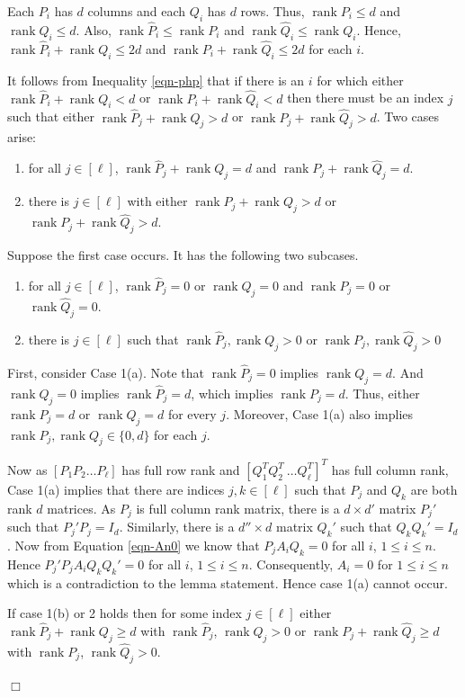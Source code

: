 \documentclass[10pt,a4paper]{article}
\newenvironment{proofof}[1]{\noindent{\it Proof of #1. }} {{\qed}}
\def\qed{\hspace*{\fill} $\Box$\par\medskip}
\newcommand{\op}[1]{\ensuremath{\operatorname{#1}}}
\newcommand{\rank}{\op{rank}}
\begin{document}
\begin{proofof}{Claim~\ref{php-simplify}}

Each $P_i$ has $d$ columns and each $Q_i$ has $d$ rows. Thus, $\rank
P_i\le d$ and $\rank Q_i\le d$. Also, $\rank \hat{P}_i \leq \rank P_i$
and $\rank \hat{Q}_i \leq \rank Q_i$. Hence, $\rank \hat{P}_i + \rank
Q_i\le 2d$ and $\rank P_i + \rank \hat{Q}_i\le 2d$ for each $i$.

It follows from Inequality \ref{eqn-php} that if there is an $i$ for
which either $\rank \hat{P}_i + \rank Q_i <d$ or $\rank {P}_i + \rank
\hat{Q}_i< d$ then there must be an index $j$ such that either $\rank
\hat{P}_j + \rank Q_j > d$ or $\rank {P}_j + \rank \hat{Q}_j > d$. Two
cases arise:

\begin{enumerate}
\item for all $j\in [\ell]$, $\rank \hat{P}_j + \rank Q_j = d$ and
  $\rank {P}_j + \rank \hat{Q}_j = d$.
\item there is $j \in [\ell]$ with either $\rank \hat{P}_j + \rank Q_j
  > d$ or $\rank {P}_j + \rank \hat{Q}_j > d$.
\end{enumerate}

Suppose the first case occurs. It has the following two subcases.

\begin{enumerate}
\item[(a)] for all $j \in[\ell]$, $\rank \hat{P}_j=0$ or $\rank Q_j = 0$ and $\rank {P}_j=0$ or $\rank \hat{Q}_j=0$.
\item[(b)] there is $j\in [\ell]$ such that $\rank \hat{P}_j, \rank
  Q_j >0$ or $\rank {P}_j, \rank \hat{Q}_j> 0$
\end{enumerate}

First, consider Case 1(a). Note that $\rank \hat{P}_j=0$ implies
$\rank Q_j =d$. And $\rank Q_j=0$ implies $\rank \hat{P}_j=d$, which
implies $\rank P_j =d$. Thus, either $\rank P_j =d$ or $\rank Q_j =d$
for every $j$. Moreover, Case 1(a) also implies $\rank P_j, \rank
Q_j\in \{0,d\}$ for each $j$.

Now as $[P_1 P_2 \ldots P_\ell]$ has full row rank and $[Q_1^T
  Q_2^T~\ldots Q_\ell^T]^T$ has full column rank, Case 1(a) implies
that there are indices $j,k \in [\ell]$ such that $P_j$ and $Q_k$ are
both rank $d$ matrices. As $P_j$ is full column rank matrix, there is
a $d \times d'$ matrix $P_j'$ such that $P_j' P_j = I_d$. Similarly,
there is a $d'' \times d$ matrix $Q_k'$ such that $Q_k Q_k'=I_d$. Now
from Equation \ref{eqn-An0} we know that $P_j A_i Q_k = 0$ for all
$i$, $1\leq i \leq n$. Hence $P_j' P_j A_i Q_k Q_k' = 0$ for all $i$,
$1\leq i \leq n$. Consequently, $A_i=0$ for $1\le i\le n$ which is a
contradiction to the lemma statement. Hence case 1(a) cannot occur.

If case 1(b) or 2 holds then for some index $j\in [\ell]$ either
$\rank \hat{P}_j + \rank Q_j \geq d$ with $\rank \hat{P}_j$, $\rank
Q_j >0$ or $\rank {P}_j + \rank \hat{Q}_j \geq d$ with $\rank {P}_j$,
$\rank \hat{Q}_j>0$. 
\end{proofof}
\end{document}
